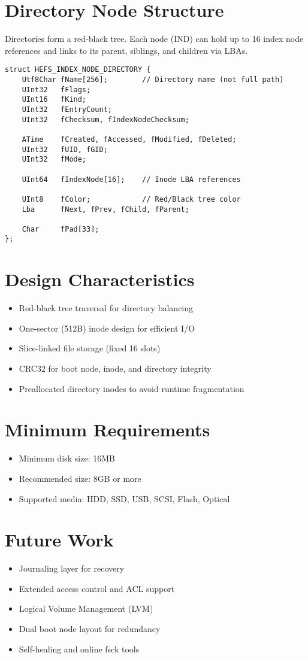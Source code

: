 \documentclass{article}
\begin{document}
\section{Directory Node Structure}
Directories form a red-black tree. Each node (IND) can hold up to 16 index node references and links to its parent, siblings, and children via LBAs.

\begin{lstlisting}[style=cstyle, caption={HEFS\_INDEX\_NODE\_DIRECTORY}]
struct HEFS_INDEX_NODE_DIRECTORY {
    Utf8Char fName[256];        // Directory name (not full path)
    UInt32   fFlags;
    UInt16   fKind;
    UInt32   fEntryCount;
    UInt32   fChecksum, fIndexNodeChecksum;

    ATime    fCreated, fAccessed, fModified, fDeleted;
    UInt32   fUID, fGID;
    UInt32   fMode;

    UInt64   fIndexNode[16];    // Inode LBA references

    UInt8    fColor;            // Red/Black tree color
    Lba      fNext, fPrev, fChild, fParent;

    Char     fPad[33];
};
\end{lstlisting}

\section{Design Characteristics}

\begin{itemize}
    \item Red-black tree traversal for directory balancing
    \item One-sector (512B) inode design for efficient I/O
    \item Slice-linked file storage (fixed 16 slots)
    \item CRC32 for boot node, inode, and directory integrity
    \item Preallocated directory inodes to avoid runtime fragmentation
\end{itemize}

\section{Minimum Requirements}

\begin{itemize}
    \item Minimum disk size: 16MB
    \item Recommended size: 8GB or more
    \item Supported media: HDD, SSD, USB, SCSI, Flash, Optical
\end{itemize}

\section{Future Work}
\begin{itemize}
    \item Journaling layer for recovery
    \item Extended access control and ACL support
    \item Logical Volume Management (LVM)
    \item Dual boot node layout for redundancy
    \item Self-healing and online fsck tools
\end{itemize}
\end{document}
